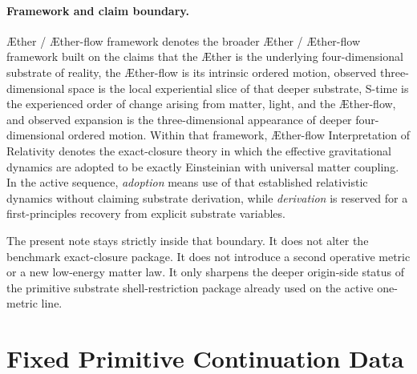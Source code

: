 \documentclass[11pt]{article}
\newcommand{\Aether}{\AE{}ther}
\newcommand{\Aflow}{\AE{}ther-flow}
\newcommand{\TheoryName}{\Aflow{} Interpretation of Relativity}
\newcommand{\TheoryProgram}{\Aether{} / \Aflow{} framework}
\begin{document}
\paragraph{Framework and claim boundary.}
\TheoryProgram{} denotes the broader \Aether{} / \Aflow{} framework built on the claims that the \Aether{} is the underlying four-dimensional substrate of reality, the \Aflow{} is its intrinsic ordered motion, observed three-dimensional space is the local experiential slice of that deeper substrate, S-time is the experienced order of change arising from matter, light, and the \Aflow{}, and observed expansion is the three-dimensional appearance of deeper four-dimensional ordered motion. Within that framework, \TheoryName{} denotes the exact-closure theory in which the effective gravitational dynamics are adopted to be exactly Einsteinian with universal matter coupling. In the active sequence, \emph{adoption} means use of that established relativistic dynamics without claiming substrate derivation, while \emph{derivation} is reserved for a first-principles recovery from explicit substrate variables.

The present note stays strictly inside that boundary. It does not alter the benchmark exact-closure package. It does not introduce a second operative metric or a new low-energy matter law. It only sharpens the deeper origin-side status of the primitive substrate shell-restriction package already used on the active one-metric line.

\section{Fixed Primitive Continuation Data}
\end{document}
